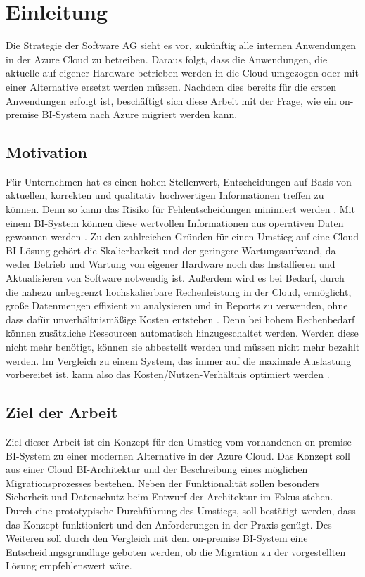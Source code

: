 \chapter{Einleitung} \label{ch:intro}
Die Strategie der Software AG sieht es vor, zukünftig alle internen Anwendungen in der Azure Cloud zu betreiben. Daraus folgt, dass die Anwendungen, die aktuelle auf eigener Hardware betrieben werden in die Cloud umgezogen oder mit einer Alternative ersetzt werden müssen. Nachdem dies bereits für die ersten Anwendungen erfolgt ist, beschäftigt sich diese Arbeit mit der Frage, wie ein on-premise BI-System nach Azure migriert werden kann.

\section{Motivation} \label{sec:intro:motivation}
Für Unternehmen hat es einen hohen Stellenwert, Entscheidungen auf Basis von aktuellen, korrekten und qualitativ hochwertigen Informationen treffen zu können. Denn so kann das Risiko für Fehlentscheidungen minimiert werden \cite{grunwald_business_2009}. Mit einem BI-System können diese wertvollen Informationen aus operativen Daten gewonnen werden \cite{muller_business_2013}. Zu den zahlreichen Gründen für einen Umstieg auf eine Cloud BI-Lösung gehört die Skalierbarkeit und der geringere Wartungsaufwand, da weder Betrieb und Wartung von eigener Hardware noch das Installieren und Aktualisieren von Software notwendig ist. Außerdem wird es bei Bedarf, durch die nahezu unbegrenzt hochskalierbare Rechenleistung in der Cloud, ermöglicht, große Datenmengen effizient zu analysieren und in Reports zu verwenden, ohne dass dafür unverhältnismäßige Kosten entstehen \cite{gurjar_cloud_2013}. Denn bei hohem Rechenbedarf können zusätzliche Ressourcen automatisch hinzugeschaltet werden. Werden diese nicht mehr benötigt, können sie abbestellt werden und müssen nicht mehr bezahlt werden. Im Vergleich zu einem System, das immer auf die maximale Auslastung vorbereitet ist, kann also das Kosten/Nutzen-Verhältnis optimiert werden \cite{ouf_cloud_2011}.

\section{Ziel der Arbeit} \label{sec:intro:ziele}
Ziel dieser Arbeit ist ein Konzept für den Umstieg vom vorhandenen on-premise BI-System zu einer modernen Alternative in der Azure Cloud. Das Konzept soll aus einer Cloud BI-Architektur und der Beschreibung eines möglichen Migrationsprozesses bestehen. Neben der Funktionalität sollen besonders Sicherheit und Datenschutz beim Entwurf der Architektur im Fokus stehen. Durch eine prototypische Durchführung des Umstiegs, soll bestätigt werden, dass das Konzept funktioniert und den Anforderungen in der Praxis genügt. Des Weiteren soll durch den Vergleich mit dem on-premise BI-System eine Entscheidungsgrundlage geboten werden, ob die Migration zu der vorgestellten Lösung empfehlenswert wäre.

